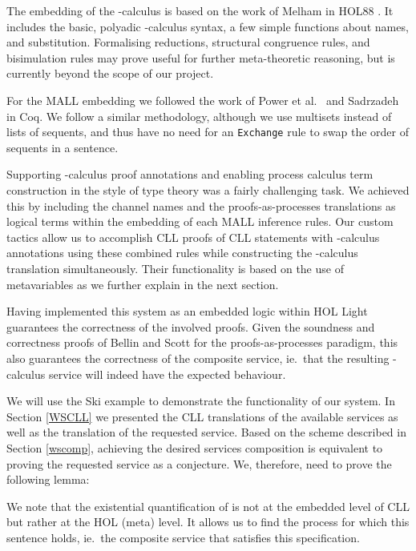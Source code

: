 \documentclass[copyright,creativecommons]{eptcs}
\begin{document}
The embedding of the -calculus is based on the work of Melham in HOL88 \cite{melham1994mechanized}. It includes the basic, polyadic -calculus syntax, a few simple functions about names, and substitution. Formalising reductions, structural congruence rules, and bisimulation rules may prove useful for further meta-theoretic reasoning, but is currently beyond the scope of our project.

For the MALL embedding we followed the work of Power et al.\ \cite{power1999working} and Sadrzadeh \cite{sadrzadeh2003modal} in Coq. We follow a similar methodology, although we use multisets instead of lists of sequents, and thus have no need for an \texttt{Exchange} rule to swap the order of sequents in a sentence. 

Supporting -calculus proof annotations and enabling process calculus term construction in the style of type theory was a fairly challenging task. We achieved this by including the channel names and the proofs-as-processes translations as logical terms within the embedding of each MALL inference rules. Our custom tactics allow us to accomplish CLL proofs of CLL statements with -calculus annotations using these combined rules while constructing the -calculus translation simultaneously. Their functionality is based on the use of metavariables as we further explain in the next section.

Having implemented this system as an embedded logic within HOL Light guarantees the correctness of the involved proofs. Given the soundness and correctness proofs of Bellin and Scott for the proofs-as-processes paradigm, this also guarantees the correctness of the composite service, ie.\ that the resulting -calculus service will indeed have the expected behaviour. 

We will use the Ski example to demonstrate the functionality of our system. In Section \ref{WSCLL} we presented the CLL translations of the available services as well as the translation of the requested service. Based on the scheme described in Section \ref{wscomp}, achieving the desired services composition is equivalent to proving the requested service as a conjecture. We, therefore, need to prove the following lemma:



We note that the existential quantification of  is not at the embedded level of CLL but rather at the HOL (meta) level. It allows us to find the process  for which this sentence holds, ie.\ the composite service that satisfies this specification.
\end{document}
